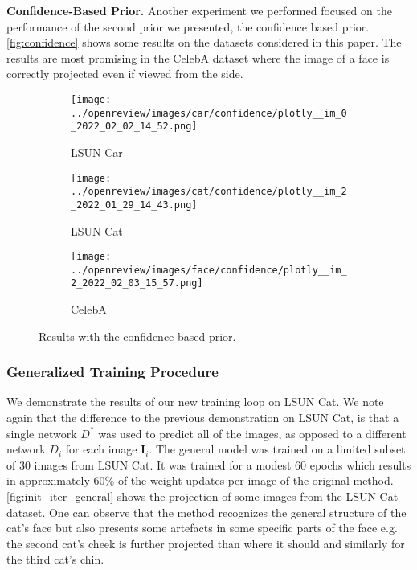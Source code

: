 \textbf{Confidence-Based Prior.}
Another experiment we performed focused on the performance of the second prior we presented, the confidence based prior. \autoref{fig:confidence} shows some results on the datasets considered in this paper. The results are most promising in the CelebA dataset where the image of a face is correctly projected even if viewed from the side.
\begin{figure}[!htb]
    \centering
    \begin{subfigure}{0.32\textwidth}
        \centering
        \texttt{[image: ../openreview/images/car/confidence/plotly\_\_im\_0\_2022\_02\_02\_14\_52.png]}
        \caption{LSUN Car}
    \end{subfigure}
    \begin{subfigure}{0.32\textwidth}
        \centering
        \texttt{[image: ../openreview/images/cat/confidence/plotly\_\_im\_2\_2022\_01\_29\_14\_43.png]}
        \caption{LSUN Cat}
    \end{subfigure}
    \begin{subfigure}{0.32\textwidth}
        \centering
        \texttt{[image: ../openreview/images/face/confidence/plotly\_\_im\_2\_2022\_02\_03\_15\_57.png]}
        \caption{CelebA}
    \end{subfigure}
    \caption{Results with the confidence based prior.}
    \label{fig:confidence}
\end{figure}

\subsubsection{Generalized Training Procedure}
\label{sec:general}
We demonstrate the results of our new training loop on LSUN Cat. We note again that the difference to the previous demonstration on LSUN Cat, is that a single network $D^*$ was used to predict all of the images, as opposed to a different network $D_i$ for each image $\textbf{I}_i$. The general model was trained on a limited subset of 30 images from LSUN Cat. It was trained for a modest $60$ epochs which results in approximately 60\% of the weight updates per image of the original method. \autoref{fig:init_iter_general} shows the projection of some images from the LSUN Cat dataset. One can observe that the method recognizes the general structure of the cat's face but also presents some artefacts in some specific parts of the face e.g. the second cat's cheek is further projected than where it should and similarly for the third cat's chin.


